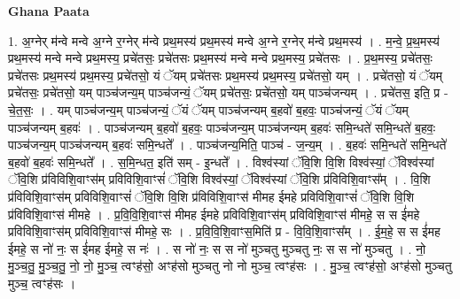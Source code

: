 \documentclass[17pt]{extarticle}
\begin{document}
\textbf{Ghana Paata } \newline

1. अ॒ग्नेर् म॑न्वे मन्वे अ॒ग्ने र॒ग्नेर् म॑न्वे प्रथ॒मस्य॑ प्रथ॒मस्य॑ मन्वे अ॒ग्ने र॒ग्नेर् म॑न्वे प्रथ॒मस्य॑ । . म॒न्वे॒ प्र॒थ॒मस्य॑ प्रथ॒मस्य॑ मन्वे मन्वे प्रथ॒मस्य॒ प्रचे॑तसः॒ प्रचे॑तसः प्रथ॒मस्य॑ मन्वे मन्वे प्रथ॒मस्य॒ प्रचे॑तसः । . प्र॒थ॒मस्य॒ प्रचे॑तसः॒ प्रचे॑तसः प्रथ॒मस्य॑ प्रथ॒मस्य॒ प्रचे॑तसो॒ यं ॅयम् प्रचे॑तसः प्रथ॒मस्य॑ प्रथ॒मस्य॒ प्रचे॑तसो॒ यम् । . प्रचे॑तसो॒ यं ॅयम् प्रचे॑तसः॒ प्रचे॑तसो॒ यम् पाञ्च॑जन्य॒म् पाञ्च॑जन्यं॒ ॅयम् प्रचे॑तसः॒ प्रचे॑तसो॒ यम् पाञ्च॑जन्यम् । . प्रचे॑तस॒ इति॒ प्र - चे॒त॒सः॒ । . यम् पाञ्च॑जन्य॒म् पाञ्च॑जन्यं॒ ॅयं ॅयम् पाञ्च॑जन्यम् ब॒हवो॑ ब॒हवः॒ पाञ्च॑जन्यं॒ ॅयं ॅयम् पाञ्च॑जन्यम् ब॒हवः॑ । . पाञ्च॑जन्यम् ब॒हवो॑ ब॒हवः॒ पाञ्च॑जन्य॒म् पाञ्च॑जन्यम् ब॒हवः॑ समि॒न्धते॑ समि॒न्धते॑ ब॒हवः॒ पाञ्च॑जन्य॒म् पाञ्च॑जन्यम् ब॒हवः॑ समि॒न्धते᳚ । . पाञ्च॑जन्य॒मिति॒ पाञ्च॑ - ज॒न्य॒म् । . ब॒हवः॑ समि॒न्धते॑ समि॒न्धते॑ ब॒हवो॑ ब॒हवः॑ समि॒न्धते᳚ । . स॒मि॒न्धत॒ इति॑ सम् - इ॒न्धते᳚ । . विश्व॑स्यां ॅवि॒शि वि॒शि विश्व॑स्यां॒ ॅविश्व॑स्यां ॅवि॒शि प्र॑विविशि॒वाꣳस॑म् प्रविविशि॒वाꣳसं॑ ॅवि॒शि विश्व॑स्यां॒ ॅविश्व॑स्यां ॅवि॒शि प्र॑विविशि॒वाꣳस᳚म् । . वि॒शि प्र॑विविशि॒वाꣳस॑म् प्रविविशि॒वाꣳसं॑ ॅवि॒शि वि॒शि प्र॑विविशि॒वाꣳस॑ मीमह ईमहे प्रविविशि॒वाꣳसं॑ ॅवि॒शि वि॒शि प्र॑विविशि॒वाꣳस॑ मीमहे । . प्र॒वि॒वि॒शि॒वाꣳस॑ मीमह ईमहे प्रविविशि॒वाꣳस॑म् प्रविविशि॒वाꣳस॑ मीमहे॒ स स ई॑महे प्रविविशि॒वाꣳस॑म् प्रविविशि॒वाꣳस॑ मीमहे॒ सः । . प्र॒वि॒वि॒शि॒वाꣳस॒मिति॑ प्र - वि॒वि॒शि॒वाꣳस᳚म् । . ई॒म॒हे॒ स स ई॑मह ईमहे॒ स नो॑ नः॒ स ई॑मह ईमहे॒ स नः॑ । . स नो॑ नः॒ स स नो॑ मुञ्चतु मुञ्चतु नः॒ स स नो॑ मुञ्चतु । . नो॒ मु॒ञ्च॒तु॒ मु॒ञ्च॒तु॒ नो॒ नो॒ मु॒ञ्च॒ त्वꣳह॑सो॒ अꣳह॑सो मुञ्चतु नो नो मुञ्च॒ त्वꣳह॑सः । . मु॒ञ्च॒ त्वꣳह॑सो॒ अꣳह॑सो मुञ्चतु मुञ्च॒ त्वꣳह॑सः । \newline
\end{document}
